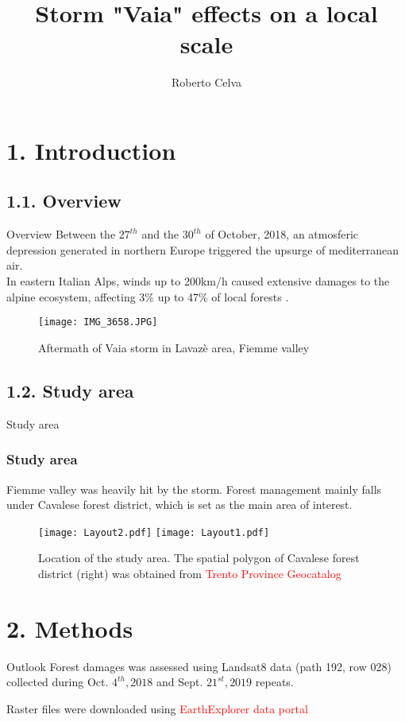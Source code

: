 \documentclass[9pt]{beamer}
\title[...]{\LARGE Storm "Vaia" effects on a local scale}
\author{\normalsize Roberto Celva \inst{1}}
\institute{\small \inst{1} Environmental Assessment and Management
}
\begin{document}
	
	\begin{frame}[plain]
		\titlepage
	\end{frame}
	
	\section{1. Introduction}
	\subsection{1.1. Overview}
		\begin{frame}{Overview}
				\justifying
				Between the $27^{th}$ and the $30^{th}$ of October, 2018, an atmosferic depression generated in northern Europe triggered the upsurge of mediterranean air.\\
				
				\bigskip
				In eastern Italian Alps, winds up to 200km/h caused extensive damages to the alpine ecosystem, affecting 3\% up to 47\% of local forests \citep{chirici}.
			\begin{figure}
				\centering
				\texttt{[image: IMG\_3658.JPG]} \caption{\scriptsize Aftermath of Vaia storm in Lavazè area, Fiemme valley}
			\end{figure}
		\end{frame}
	
	\subsection{1.2. Study area}
	\begin{frame}{Study area}
		\frametitle{Study area}
		\justifying
		Fiemme valley was heavily hit by the storm. Forest management mainly falls under Cavalese forest district, which is set as the main area of interest.
	\begin{figure}
		\texttt{[image: Layout2.pdf]}
		\texttt{[image: Layout1.pdf]}
		\caption{\scriptsize Location of the study area. The spatial polygon of Cavalese forest district (right) was obtained from \textcolor{red}{Trento Province Geocatalog} \href{https://siat.provincia.tn.it/geonetwork}{}}
	\end{figure}
\end{frame}

\section{2. Methods}
\begin{frame}{Outlook}
	\justifying
	Forest damages was assessed using Landsat8 data (path 192, row 028) collected during Oct. $4^{th}, 2018$ and Sept. $21^{st}, 2019$ repeats.
	
	\bigskip
	Raster files were downloaded using \textcolor{red}{EarthExplorer data portal} \href{https://earthexplorer.usgs.gov/}{}\\
\end{frame}
	
\end{document}
